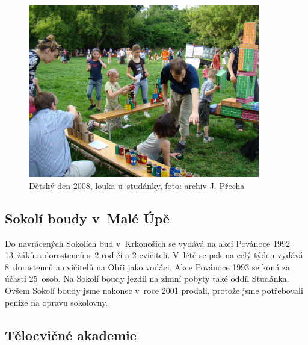 \documentclass[a5paper, 11pt, twoside]{article}
\begin{document}
\begin{figure}[h!]
  \centering 
  \includegraphics[width=0.9\textwidth]{img/43_detsky_den.JPG}
  \caption*{Dětský den 2008, louka u~studánky, foto: archiv J. Přecha}
\end{figure}

\subsection{Sokolí boudy v~Malé Úpě}

Do navrácených Sokolích bud v~Krkonoších se vydává na akci Povánoce 1992
13~žáků a dorostenců s~2 rodiči a 2 cvičiteli. V~létě se pak na celý
týden vydává 8~dorostenců a cvičitelů na Ohři jako vodáci. Akce Povánoce
1993 se koná za účasti 25~osob. Na Sokolí boudy jezdil na zimní pobyty
také oddíl Studánka. Ovšem Sokolí boudy jsme nakonec v~roce 2001
prodali, protože jsme potřebovali peníze na opravu sokolovny.

\subsection{Tělocvičné akademie}
\end{document}
